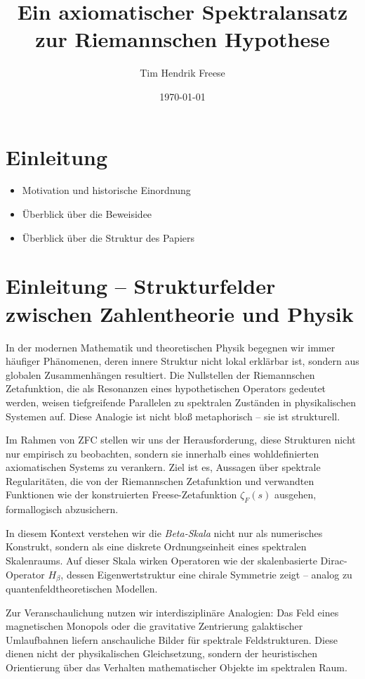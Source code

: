 \documentclass[12pt]{article}
\title{\textbf{Ein axiomatischer Spektralansatz zur Riemannschen Hypothese}}
\author{Tim Hendrik Freese}
\date{\today}
\begin{document}
\maketitle
\tableofcontents
\newpage

\section{Einleitung}
\begin{itemize}
  \item Motivation und historische Einordnung
  \item Überblick über die Beweisidee
  \item Überblick über die Struktur des Papiers
\end{itemize}

\section*{Einleitung – Strukturfelder zwischen Zahlentheorie und Physik}

In der modernen Mathematik und theoretischen Physik begegnen wir immer häufiger Phänomenen, deren innere Struktur nicht lokal erklärbar ist, sondern aus globalen Zusammenhängen resultiert. Die Nullstellen der Riemannschen Zetafunktion, die als Resonanzen eines hypothetischen Operators gedeutet werden, weisen tiefgreifende Parallelen zu spektralen Zuständen in physikalischen Systemen auf. Diese Analogie ist nicht bloß metaphorisch – sie ist strukturell.

Im Rahmen von \textsf{ZFC} stellen wir uns der Herausforderung, diese Strukturen nicht nur empirisch zu beobachten, sondern sie innerhalb eines wohldefinierten axiomatischen Systems zu verankern. Ziel ist es, Aussagen über spektrale Regularitäten, die von der Riemannschen Zetafunktion und verwandten Funktionen wie der konstruierten Freese-Zetafunktion $\zeta_F(s)$ ausgehen, formallogisch abzusichern.

In diesem Kontext verstehen wir die \emph{Beta-Skala} nicht nur als numerisches Konstrukt, sondern als eine diskrete Ordnungseinheit eines spektralen Skalenraums. Auf dieser Skala wirken Operatoren wie der skalenbasierte Dirac-Operator $H_\beta$, dessen Eigenwertstruktur eine chirale Symmetrie zeigt – analog zu quantenfeldtheoretischen Modellen.

Zur Veranschaulichung nutzen wir interdisziplinäre Analogien: Das Feld eines magnetischen Monopols oder die gravitative Zentrierung galaktischer Umlaufbahnen liefern anschauliche Bilder für spektrale Feldstrukturen. Diese dienen nicht der physikalischen Gleichsetzung, sondern der heuristischen Orientierung über das Verhalten mathematischer Objekte im spektralen Raum.
\end{document}
